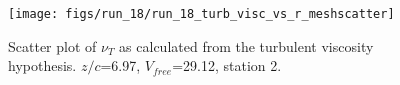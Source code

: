 \begin{figure}[H]
\centering
\texttt{[image: figs/run\_18/run\_18\_turb\_visc\_vs\_r\_meshscatter]}
\caption{Scatter plot of $\nu_T$ as calculated from the turbulent viscosity hypothesis. $z/c$=6.97, $V_{free}$=29.12, station 2.}
\label{fig:run_18_turb_visc_vs_r_meshscatter}
\end{figure}


